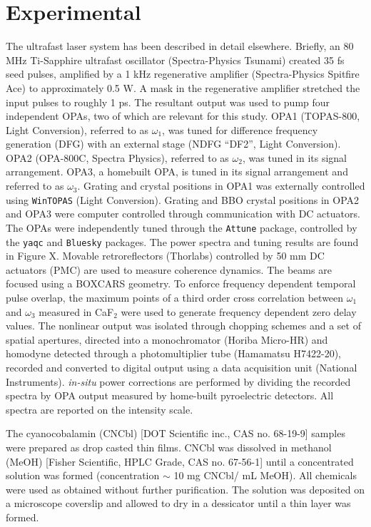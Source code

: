 \documentclass[aip, jcp, reprint, onecolumn]{revtex4-2}
\begin{document}
\section{Experimental}\label{experimental}
The ultrafast laser system has been described in detail elsewhere. \cite{RN278}
Briefly, an 80 MHz Ti-Sapphire ultrafast oscillator  (Spectra-Physics Tsunami) created 35 fs seed pulses, amplified by a 1 kHz regenerative amplifier (Spectra-Physics Spitfire Ace) to approximately 0.5 W.
A mask in the regenerative amplifier stretched the input pulses to roughly 1 ps.
The resultant output was used to pump four independent OPAs, two of which are relevant for this study.
OPA1 (TOPAS-800, Light Conversion), referred to as $\omega_1$, was tuned for difference frequency generation (DFG) with an external stage (NDFG ``DF2'', Light Conversion).
OPA2 (OPA-800C, Spectra Physics), referred to as $\omega_2$, was tuned in its signal arrangement. 
OPA3, a homebuilt OPA, is tuned in its signal arrangement and referred to as $\omega_3$.
Grating and crystal positions in OPA1 was externally controlled using \texttt{WinTOPAS} (Light Conversion).
Grating and BBO crystal positions in OPA2 and OPA3 were computer controlled through communication with DC actuators.
The OPAs were independently tuned through the \texttt{Attune} package, controlled by the \texttt{yaqc} and \texttt{Bluesky} packages. \cite{RN414, RN386, SkyeOPA, KyleOPA}
The power spectra and tuning results are found in Figure X. %
Movable retroreflectors (Thorlabs) controlled by 50 mm DC actuators (PMC) are used to measure coherence dynamics.
The beams are focused using a BOXCARS geometry.\cite{RN308, Kaufman2024}
To enforce frequency dependent temporal pulse overlap, the maximum points of a third order cross correlation between $\omega_1$ and $\omega_3$ measured in CaF$_2$ were used to generate frequency dependent zero delay values.
The nonlinear output was isolated through chopping schemes and a set of spatial apertures, directed into a monochromator (Horiba Micro-HR) and homodyne detected through a photomultiplier tube (Hamamatsu H7422-20), recorded and converted to digital output using a data acquisition unit (National Instruments).
\textit{in-situ} power corrections are performed by dividing the recorded spectra by OPA output measured by home-built pyroelectric detectors.
All spectra are reported on the intensity scale.

The cyanocobalamin (CNCbl) [DOT Scientific inc., CAS no. 68-19-9] samples were prepared as drop casted thin films.
CNCbl was dissolved in methanol (MeOH) [Fisher Scientific, HPLC Grade, CAS no. 67-56-1] until a concentrated solution was formed (concentration $\sim$ 10 mg CNCbl/ mL MeOH). 
All chemicals were used as obtained without further purification.
The solution was deposited on a microscope coverslip and allowed to dry in a dessicator until a thin layer was formed.
\end{document}
